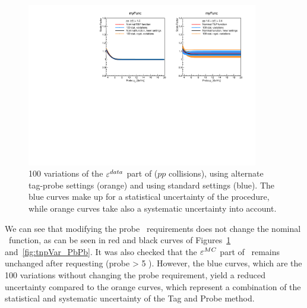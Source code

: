 \begin{figure}
  \begin{center}
    \includegraphics[width=0.9\textwidth]{Chapters/aCorrection/TNP_pp_100variations_new.pdf}
    \caption{
      100 variations of the $\varepsilon^{data}$ part of \Ctnp ($pp$ collisions), using alternate
      tag-probe settings (orange) and using standard settings
      (blue). The blue curves make up for a statistical uncertainty of
      the procedure, while orange curves take also a systematic
      uncertainty into account.
    }
    \label{fig:tnpVar_pp}
  \end{center}
\end{figure}

 We can see that modifying the probe \pt\ requirements does not change
 the nominal \Ctnp\ function, as can be seen in red and black curves
 of Figures~\ref{fig:tnpVar_pp} and~\ref{fig:tnpVar_PbPb}. It was also checked
that the $\varepsilon^{MC}$ part of \Ctnp\ remains unchanged after requesting
(probe \pt > 5 \GeVc). However, the blue curves, which are the 100
variations without changing the probe requirement, yield a reduced
uncertainty compared to the orange curves, which represent a
combination of the statistical and systematic uncertainty of the Tag
and Probe method. 

